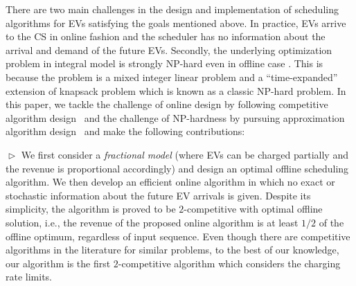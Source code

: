 
There are two main challenges in the design and implementation of scheduling algorithms for EVs satisfying the goals mentioned above.  In practice, EVs arrive to the CS in online fashion and the scheduler has no information about the arrival and demand of the future EVs. Secondly, the underlying optimization problem in integral model is strongly NP-hard even in offline case . This is because the problem is a mixed integer linear problem and a ``time-expanded'' extension of knapsack problem which is known as a classic NP-hard problem. In this paper, we tackle the challenge of online design by following competitive algorithm design~\cite{borodin2005online} and the challenge of NP-hardness by pursuing approximation algorithm design~\cite{approx} and make the following contributions: 

$\vartriangleright$ We first consider a \textit{fractional model} (where EVs can be charged partially and the revenue is proportional accordingly) and design an optimal offline scheduling algorithm. 
We then develop an efficient online algorithm in which no exact or stochastic information about the future EV arrivals is given. Despite its simplicity, the algorithm is proved to be $2$-competitive with optimal offline solution, i.e., the revenue of the proposed online algorithm is at least $1/2$ of the offline optimum, regardless of input sequence. 
Even though there are competitive algorithms in the literature for similar problems, to the best of our knowledge, our algorithm is the first $2$-competitive algorithm which considers the charging rate limits.

